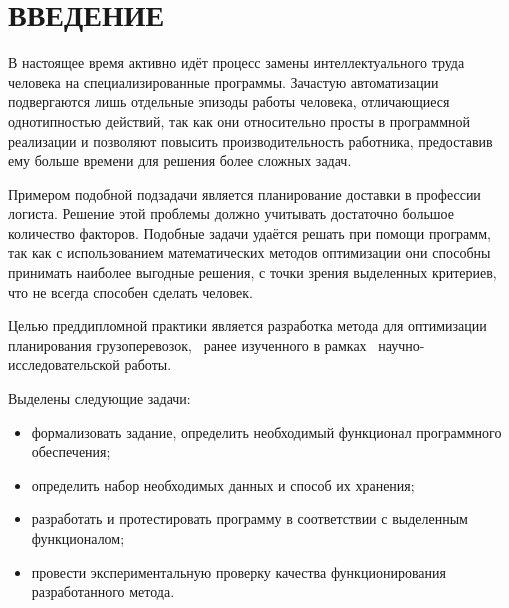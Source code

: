 \section*{ВВЕДЕНИЕ}

В настоящее время активно идёт процесс замены интеллектуального труда человека на специализированные программы. Зачастую автоматизации подвергаются лишь отдельные эпизоды работы человека, отличающиеся однотипностью действий, так как они относительно просты в программной реализации и позволяют повысить производительность работника, предоставив ему больше времени для решения более сложных задач.

Примером подобной подзадачи является планирование доставки в профессии логиста. Решение этой проблемы должно учитывать достаточно большое количество факторов. Подобные задачи удаётся решать при помощи программ, так как с использованием математических методов оптимизации они способны принимать наиболее выгодные решения, с точки зрения выделенных критериев, что не всегда способен сделать человек.

Целью преддипломной практики является разработка метода для оптимизации планирования грузоперевозок, \, ранее изученного в рамках \, научно-исследовательской работы.

Выделены следующие задачи:
\begin{itemize}
	\item формализовать задание, определить необходимый функционал программного обеспечения;
	\item определить набор необходимых данных и способ их хранения;
	\item разработать и протестировать программу в соответствии с выделенным функционалом;
	\item провести экспериментальную проверку качества функционирования разработанного метода.	
\end{itemize}

\pagebreak